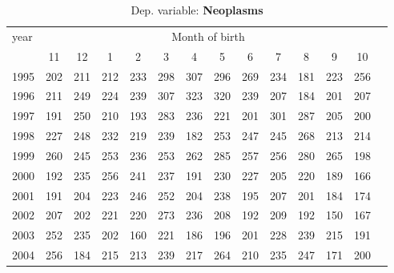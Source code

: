  \begin{table}[H] \begin{threeparttable} \centering \caption{Dep. variable: \textbf{Neoplasms}} {\def\sym#1{\ifmmode^{#1}\else\(^{#1}\)\fi} \begin{tabular}{l*{13}{c}} \toprule year & \multicolumn{12}{c}{Month of birth} \\ \cmidrule(lr){2-13} 
            &          11&          12&           1&           2&           3&           4&           5&           6&           7&           8&           9&          10\\
1995        &         202&         211&         212&         233&         298&         307&         296&         269&         234&         181&         223&         256\\
1996        &         211&         249&         224&         239&         307&         323&         320&         239&         207&         184&         201&         207\\
1997        &         191&         250&         210&         193&         283&         236&         221&         201&         301&         287&         205&         200\\
1998        &         227&         248&         232&         219&         239&         182&         253&         247&         245&         268&         213&         214\\
1999        &         260&         245&         253&         236&         253&         262&         285&         257&         256&         280&         265&         198\\
2000        &         192&         235&         256&         241&         237&         191&         230&         227&         205&         220&         189&         166\\
2001        &         191&         204&         223&         246&         252&         204&         238&         195&         207&         201&         184&         174\\
2002        &         207&         202&         221&         220&         273&         236&         208&         192&         209&         192&         150&         167\\
2003        &         252&         235&         202&         160&         221&         186&         196&         201&         228&         239&         215&         191\\
2004        &         256&         184&         215&         213&         239&         217&         264&         210&         235&         247&         171&         200\\

\end{tabular}}
\end{threeparttable}
\end{table}
